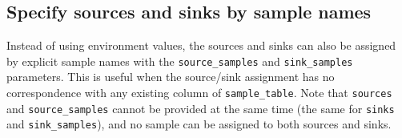 \documentclass[
]{book}
\newenvironment{Shaded}{\begin{snugshade}}{\end{snugshade}}
\newcommand{\AttributeTok}[1]{\textcolor[rgb]{0.13,0.29,0.53}{#1}}
\newcommand{\CommentTok}[1]{\textcolor[rgb]{0.56,0.35,0.01}{\textit{#1}}}
\newcommand{\DecValTok}[1]{\textcolor[rgb]{0.00,0.00,0.81}{#1}}
\newcommand{\FunctionTok}[1]{\textcolor[rgb]{0.13,0.29,0.53}{\textbf{#1}}}
\newcommand{\NormalTok}[1]{#1}
\newcommand{\OtherTok}[1]{\textcolor[rgb]{0.56,0.35,0.01}{#1}}
\newcommand{\SpecialCharTok}[1]{\textcolor[rgb]{0.81,0.36,0.00}{\textbf{#1}}}
\newcommand{\StringTok}[1]{\textcolor[rgb]{0.31,0.60,0.02}{#1}}
\begin{document}
\begin{Shaded}
\end{Shaded}

\subsection{Specify sources and sinks by sample names}\label{specify-sources-and-sinks-by-sample-names}

Instead of using environment values, the sources and sinks can also be assigned by explicit sample names
with the \texttt{source\_samples} and \texttt{sink\_samples} parameters.
This is useful when the source/sink assignment has no correspondence with any existing column of \texttt{sample\_table}.
Note that \texttt{sources} and \texttt{source\_samples} cannot be provided at the same time (the same for \texttt{sinks} and \texttt{sink\_samples}),
and no sample can be assigned to both sources and sinks.
\end{document}
